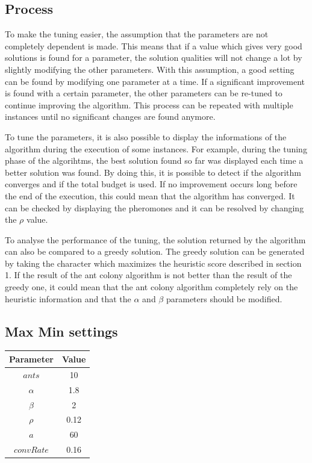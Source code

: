 \documentclass{article}
\begin{document}
\subsection{Process}

To make the tuning easier, the assumption that the parameters are not completely dependent is made.
This means that if a value which gives very good solutions is found for a parameter, the solution qualities will not change a lot by slightly modifying the other parameters.
With this assumption, a good setting can be found by modifying one parameter at a time.
If a significant improvement is found with a certain parameter, the other parameters can be re-tuned to continue improving the algorithm.
This process can be repeated with multiple instances until no significant changes are found anymore.\newline

To tune the parameters, it is also possible to display the informations of the algorithm during the execution of some instances.
For example, during the tuning phase of the algorihtms, the best solution found so far was displayed each time a better solution was found.
By doing this, it is possible to detect if the algorithm converges and if the total budget is used.
If no improvement occurs long before the end of the execution, this could mean that the algorithm has converged.
It can be checked by displaying the pheromones and it can be resolved by changing the $\rho$ value.\newline

To analyse the performance of the tuning, the solution returned by the algorithm can also be compared to a greedy solution.
The greedy solution can be generated by taking the character which maximizes the heuristic score described in section 1.
If the result of the ant colony algorithm is not better than the result of the greedy one, it could mean that the ant colony algorithm completely rely on the heuristic information and that the $\alpha$ and $\beta$ parameters should be modified.

\subsection{Max Min settings}

\begin{tabular}{c|c}
    Parameter & Value \\ \hline
    $ants$    & 10    \\
    $\alpha$  & 1.8   \\
    $\beta$   & 2     \\
    $\rho$    & 0.12  \\
    $a$       & 60    \\
    $convRate$& 0.16  \\
\end{tabular}
\end{document}

